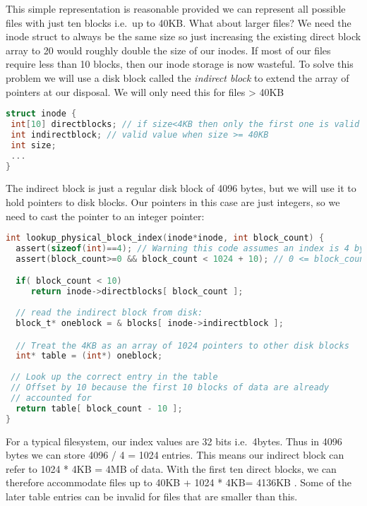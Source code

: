 This simple representation is reasonable provided we can represent all possible files with just ten blocks i.e.~up to 40KB. What about larger files? We need the inode struct to always be the same size so just increasing the existing direct block array to 20 would roughly double the size of our inodes. If most of our files require less than 10 blocks, then our inode storage is now wasteful. To solve this problem we will use a disk block called the \emph{indirect block} to extend the array of pointers at our disposal. We will only need this for files \textgreater{} 40KB

\begin{lstlisting}[language=C]
struct inode {
 int[10] directblocks; // if size<4KB then only the first one is valid
 int indirectblock; // valid value when size >= 40KB
 int size;
 ...
}
\end{lstlisting}

The indirect block is just a regular disk block of 4096 bytes, but we will use it to hold pointers to disk blocks. Our pointers in this case are just integers, so we need to cast the pointer to an integer pointer:

\begin{lstlisting}[language=C]
int lookup_physical_block_index(inode*inode, int block_count) {
  assert(sizeof(int)==4); // Warning this code assumes an index is 4 bytes!
  assert(block_count>=0 && block_count < 1024 + 10); // 0 <= block_count< 1034

  if( block_count < 10)
     return inode->directblocks[ block_count ];
  
  // read the indirect block from disk:
  block_t* oneblock = & blocks[ inode->indirectblock ];

  // Treat the 4KB as an array of 1024 pointers to other disk blocks
  int* table = (int*) oneblock;
  
 // Look up the correct entry in the table
 // Offset by 10 because the first 10 blocks of data are already 
 // accounted for
  return table[ block_count - 10 ];
}
\end{lstlisting}

For a typical filesystem, our index values are 32 bits i.e.~4bytes. Thus in 4096 bytes we can store 4096 / 4 = 1024 entries. This means our indirect block can refer to 1024 * 4KB = 4MB of data. With the first ten direct blocks, we can therefore accommodate files up to 40KB + 1024 * 4KB= 4136KB . Some of the later table entries can be invalid for files that are smaller than this.

